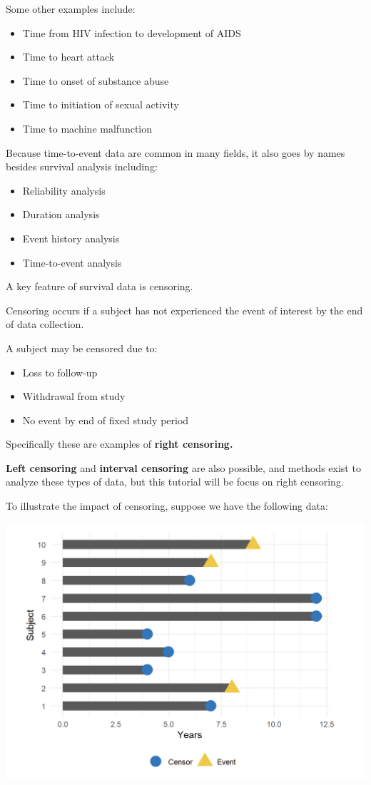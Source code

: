\documentclass[
]{book}
\providecommand{\tightlist}{%
  \setlength{\itemsep}{0pt}\setlength{\parskip}{0pt}}
\begin{document}
Some other examples include:

\begin{itemize}
\tightlist
\item
  Time from HIV infection to development of AIDS
\item
  Time to heart attack
\item
  Time to onset of substance abuse
\item
  Time to initiation of sexual activity
\item
  Time to machine malfunction
\end{itemize}

Because time-to-event data are common in many fields, it also goes by names besides survival analysis including:

\begin{itemize}
\tightlist
\item
  Reliability analysis
\item
  Duration analysis
\item
  Event history analysis
\item
  Time-to-event analysis
\end{itemize}

A key feature of survival data is censoring.

Censoring occurs if a subject has not experienced the event of interest by the end of data collection.

A subject may be censored due to:

\begin{itemize}
\tightlist
\item
  Loss to follow-up
\item
  Withdrawal from study
\item
  No event by end of fixed study period
\end{itemize}

Specifically these are examples of \textbf{right censoring.}

\textbf{Left censoring} and \textbf{interval censoring} are also possible, and methods exist to analyze these types of data, but this tutorial will be focus on right censoring.

To illustrate the impact of censoring, suppose we have the following data:

\includegraphics{figs/survival1.png}
\end{document}
